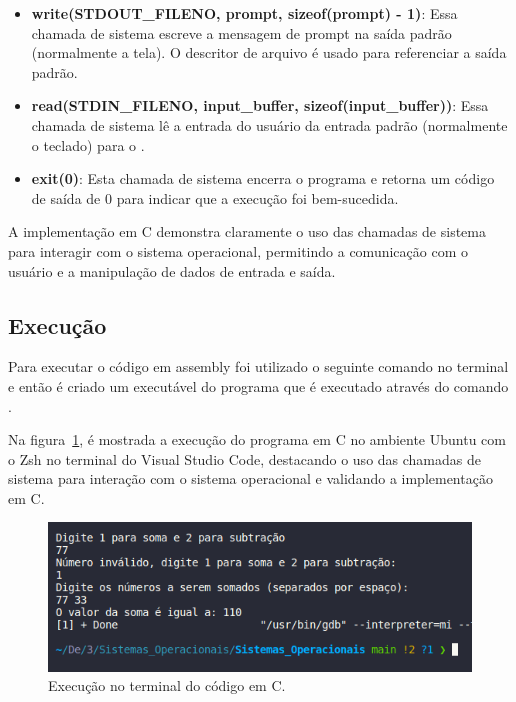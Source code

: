 \documentclass[
	12pt,				%
	openright,			%
	oneside,			%
	a4paper,			%
	chapter=TITLE,		%
	english,			%
	french,				%
	spanish,			%
	brazil				%
	]{abntex2}
\theoremstyle{definition}
\begin{document}
\begin{itemize}
    \item \textbf{write(STDOUT\_FILENO, prompt, sizeof(prompt) - 1)}: Essa chamada de sistema 
	escreve a mensagem de prompt na saída padrão (normalmente a tela). O descritor de arquivo 
	 é usado para referenciar a saída padrão.

    \item \textbf{read(STDIN\_FILENO, input\_buffer, sizeof(input\_buffer))}: Essa chamada de 
	sistema lê a entrada do usuário da entrada padrão (normalmente o teclado) para o .

    \item \textbf{exit(0)}: Esta chamada de sistema encerra o programa e retorna um código de 
	saída de 0 para indicar que a execução foi bem-sucedida.

\end{itemize}

A implementação em C demonstra claramente o uso das chamadas de sistema para interagir com o 
sistema operacional, permitindo a comunicação com o usuário e a manipulação de dados de entrada e saída.

\subsection{Execução}

Para executar o código em assembly foi utilizado o seguinte comando no terminal 
e então é criado um executável do programa que é executado através do comando .

Na figura~\ref{fig:run_c}, é mostrada a execução do programa em C no ambiente Ubuntu com o Zsh no terminal do Visual Studio 
Code, destacando o uso das chamadas de sistema para interação com o sistema operacional e validando a implementação em C.

\begin{figure}
    \centering
    \includegraphics[width=1.0\textwidth]{imagens/run_c.png}
	\caption{Execução no terminal do código em C.}
	\label{fig:run_c}
\end{figure}
\end{document}
